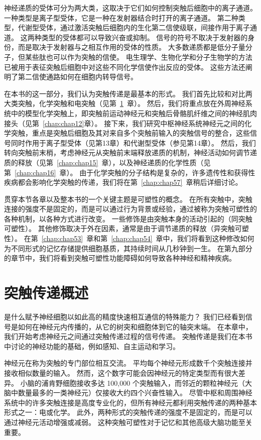 神经递质的受体可分为两大类，这取决于它们如何控制突触后细胞中的离子通道。
一种类型是离子型受体，它是一种在发射器结合时打开的离子通道。
第二种类型，代谢型受体，通过激活突触后细胞内的生化第二信使级联，间接作用于离子通道。
这两种类型的受体都可以导致兴奋或抑制。
信号的符号不取决于发射器的身份，而是取决于发射器与之相互作用的受体的性质。
大多数递质都是低分子量分子，但某些肽也可以作为突触的信使。
电生理学、生物化学和分子生物学的方法已被用于表征突触后细胞中对这些不同化学信使作出反应的受体。
这些方法还阐明了第二信使通路如何在细胞内转导信号。


在本书的这一部分，我们认为突触传递是最基本的形式。
我们首先比较和对比两大类突触，化学突触和电突触（见第~\ref{chap:chap11}~章）。
然后，我们将重点放在外周神经系统中的模型化学突触上，即突触前运动神经元和突触后骨骼肌纤维之间的神经肌肉接头（见第~\ref{chap:chap12}章）。
接下来，我们研究中枢神经系统神经元之间的化学突触，重点是突触后细胞及其对来自多个突触前输入的突触信号的整合，这些信号同时作用于离子型受体（见第13章）和代谢型受体（参见第14章）。
然后，我们转向突触前末梢，考虑神经元从突触前末端释放递质的机制，神经活动如何调节递质的释放（见第~\ref{chap:chap15}~章），以及神经递质的化学性质（见第~\ref{chap:chap16}~章）。
由于化学突触的分子结构是复杂的，许多遗传性和获得性疾病都会影响化学突触的传递，我们将在第~\ref{chap:chap57}~章稍后详细讨论。


贯穿本节各章以及整本书的一个关键主题是可塑性的概念。
在所有突触中，突触连接的强度不是固定的，而是可以通过行为背景或经验，通过被称为突触可塑性的各种机制，以各种方式进行改变。
一些修饰是由突触本身的活动引起的（同突触可塑性）。
其他修饰取决于外在因素，通常是由于调节递质的释放（异突触可塑性）。
在第~\ref{chap:chap53}~章和第~\ref{chap:chap54}~章中，我们将看到这种修改如何为不同形式的记忆存储提供细胞基质，其持续时间从几秒钟到一生。
在第九部分的章节中，我们将看到突触可塑性功能障碍如何导致各种神经和精神疾病。



\chapter{突触传递概述} \label{chap:chap11}

是什么赋予神经细胞以如此高的精度快速相互通信的特殊能力？
我们已经看到信号是如何在神经元内传播的，从它的树突和细胞体到它的轴突末端。
在本章中，我们开始考虑神经元之间通过突触传递过程的信号传递。
突触传递是我们在本书中讨论的神经功能的基础，例如感知、自主运动和学习。


神经元在称为突触的专门部位相互交流。
平均每个神经元形成数千个突触连接并接收相似数量的输入。
然而，这个数字可能会因神经元的特定类型而有很大差异。
小脑的浦肯野细胞接收多达 100,000 个突触输入，而邻近的颗粒神经元（大脑中数量最多的一类神经元）仅接收大约四个兴奋性输入。
尽管中枢和周围神经系统中的许多突触连接是高度专业化的，但所有神经元都利用突触传递的两种基本形式之一：电或化学。
此外，两种形式的突触传递的强度不是固定的，而是可以通过神经元活动增强或减弱。
这种突触可塑性对于记忆和其他高级大脑功能至关重要。


